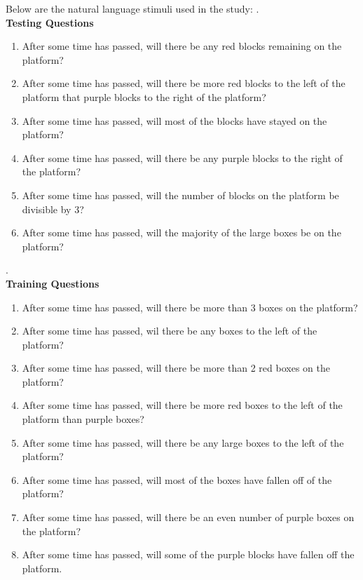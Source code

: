 \documentclass[10pt,letterpaper]{article}
\begin{document}
Below are the natural language stimuli used in the study:
.
\\
\textbf{Testing Questions}
\begin{displayquote}
\begin{enumerate}
\item After some time has passed, will there be any red blocks remaining on the platform?
\item After some time has passed, will there be more red blocks to the left of the platform that purple blocks to the right of the platform?
\item After some time has passed, will most of the blocks have stayed on the platform?
\item After some time has passed, will there be any purple blocks to the right of the platform?
\item After some time has passed, will the number of blocks on the platform be divisible by 3?
\item After some time has passed, will the majority of the large boxes be on the platform?
\end{enumerate}
\end{displayquote}.
\\
\textbf{Training Questions}
\begin{displayquote}
    \begin{enumerate}
        \item After some time has passed, will there be more than 3 boxes on the platform?
\item After some time has passed, wil there be any boxes to the left of the platform?
\item After some time has passed, will there be more than 2 red boxes on the platform?
\item After some time has passed, will there be more red boxes to the left of the platform than purple boxes?
\item After some time has passed, will there be any large boxes to the left of the platform?
\item After some time has passed, will most of the boxes have fallen off of the platform?
\item After some time has passed, will there be an even number of purple boxes on the platform?
\item After some time has passed, will some of the purple blocks have fallen off the platform.
    \end{enumerate}
\end{displayquote}
\end{document}
